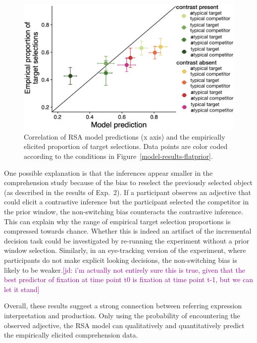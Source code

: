 \documentclass[10pt,letterpaper]{article}
\newcommand{\jd}[1]{\textcolor{Purple}{[jd: #1]}}
\begin{document}
\begin{figure}
	\begin{center}
		\includegraphics[width=.475\textwidth]{graphs/corr-plot.pdf}
	\end{center}
\caption{Correlation of RSA model predictions (x axis) and the empirically elicited proportion of target selections. Data points are color coded according to the conditions in Figure~\ref{model-results-flatprior}.} 
\label{model-results-corr-flatprior}
\end{figure}

One possible explanation is that the inferences appear smaller in the comprehension study because of the bias to reselect the previously selected object (as described in the results of Exp.~2). If a participant observes an adjective that could elicit a contrastive inference but the participant selected the competitor in the prior window, the non-switching bias counteracts the contrastive inference. This can explain why the range of empirical target selection proportions is compressed towards chance. Whether this is indeed an artifact of the incremental decision task could be investigated by re-running the experiment without a prior window selection. Similarly, in an eye-tracking version of the experiment, where participants do not make explicit looking decisions, the non-switching bias is likely to be weaker.\jd{i'm actually not entirely sure this is true, given that the best predictor of fixation at time point t0 is fixation at time point t-1, but we can let it stand}

Overall, these results suggest a strong connection between referring expression interpretation and production. Only using the probability of encountering the observed adjective, the RSA model can qualitatively and quantitatively predict the empirically elicited comprehension data. 
\end{document}
